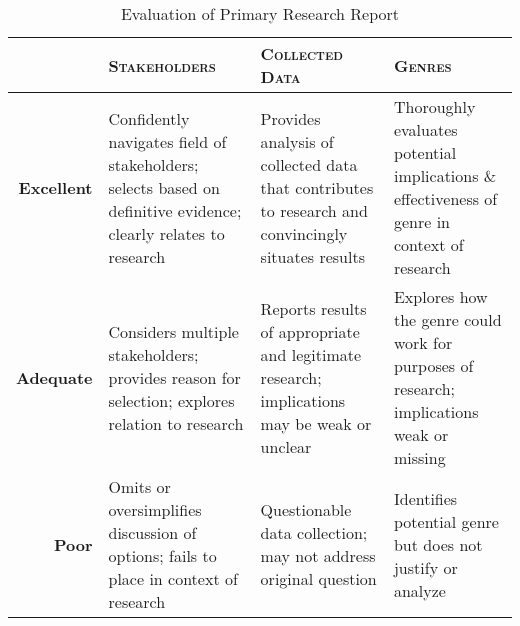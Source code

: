 \documentclass[11pt, twosides]{amsart}	%
\begin{document}
\begin{table}[b]
	\caption{Evaluation of Primary Research Report}\label{tab:rubric}
\begin{tabulary}{\textwidth}{rLLL}
	\toprule  & \textbf{\textsc{Stakeholders}} 
	& \textbf{\textsc{Collected Data}}
	& \textbf{\textsc{Genres}}
	\\
\midrule	\textbf{Excellent} 
& Confidently navigates field of stakeholders; selects based on definitive evidence; clearly relates to research 
& Provides analysis of collected data that contributes to research and convincingly situates results
& Thoroughly evaluates potential implications \& effectiveness of genre in context of research
\\
\midrule	\textbf{Adequate} 
& Considers multiple stakeholders; provides reason for selection; explores relation to research 
& Reports results of appropriate and legitimate research; implications may be weak or unclear
& Explores how the genre could work for purposes of research; implications weak or missing
\\
\midrule	\textbf{Poor} 
& Omits or oversimplifies discussion of options; fails to place in context of research 
& Questionable data collection; may not address original question
& Identifies potential genre but does not justify or analyze
\\
	\bottomrule
\end{tabulary}
\end{table}

\end{document}
